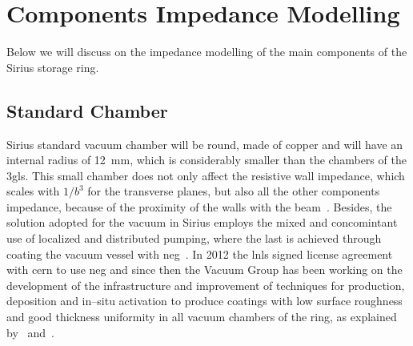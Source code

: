 \chapter{Components Impedance Modelling}\label{cap:impedance_modelling}

    Below we will discuss on the impedance modelling of the main components of the Sirius storage ring.

\section{Standard Chamber}

    Sirius standard vacuum chamber will be round, made of copper and will have an internal radius of \SI{12}{\milli\meter}, which is considerably smaller than the chambers of the \gls{3gls}.
    This small chamber does not only affect the resistive wall impedance, which scales with $1/b^3$ for the transverse planes, but also all the other components impedance, because of the proximity of the walls with the beam~\cite{Nagaoka2014}. Besides, the solution adopted for the vacuum in Sirius employs the mixed and concomintant use of localized and distributed pumping, where the last is achieved through coating the vacuum vessel with \gls{neg}~\cite{Benvenuti1998,Prodromides2002}. In 2012 the \gls{lnls} signed license agreement with \gls{cern} to use \gls{neg} and since then the Vacuum Group has been working on the development of the infrastructure and improvement of techniques for production, deposition and in--situ activation to produce coatings with low surface roughness and good thickness uniformity in all vacuum chambers of the ring, as explained by~ and~.

